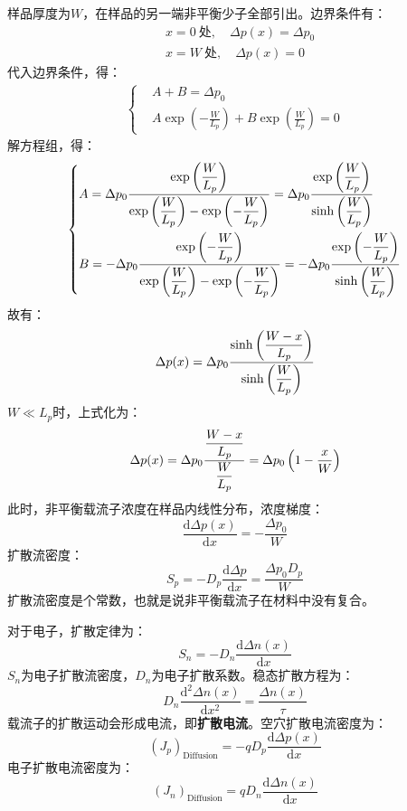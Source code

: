 样品厚度为$W$，在样品的另一端非平衡少子全部引出。边界条件有：
\begin{align}
    &x=0\ \text{处},\quad \Delta p(x)=\Delta p_0\\
    &x=W\ \text{处},\quad \Delta p(x)=0
\end{align}
代入边界条件，得：
\begin{align}
\left\{
\begin{aligned}
    &A+B=\Delta p_0\\
    &A\exp{\left(-\frac{W}{L_p}\right)}+B\exp{\left(\frac{W}{L_p}\right)}=0
\end{aligned}
\right.
\end{align}
解方程组，得：
\begin{align}
    \left\{
    \begin{aligned}
        &A=\Delta p_0\frac{\displaystyle \exp{\left(\frac{W}{L_p}\right)}}{\displaystyle \exp{\left(\frac{W}{L_p}\right)}-\exp{\left(-\frac{W}{L_p}\right)}}=\Delta p_0\frac{\displaystyle \exp{\left(\frac{W}{L_p}\right)}}{\displaystyle \sinh{\left(\frac{W}{L_p}\right)}}\\
        &B=-\Delta p_0\frac{\displaystyle \exp{\left(-\frac{W}{L_p}\right)}}{\displaystyle \exp{\left(\frac{W}{L_p}\right)}-\exp{\left(-\frac{W}{L_p}\right)}}=-\Delta p_0\frac{\displaystyle \exp{\left(-\frac{W}{L_p}\right)}}{\displaystyle \sinh{\left(\frac{W}{L_p}\right)}}
    \end{aligned}
    \right.
\end{align}
故有：
\begin{equation}
    \Delta p(x)=\Delta p_0\frac{\displaystyle \sinh{\left(\frac{W-x}{L_p}\right)}}{\displaystyle\sinh{\left(\frac{W}{L_p}\right)}}
\end{equation}
$W\ll L_p$时，上式化为：
\begin{equation}
    \Delta p(x)=\Delta p_0\frac{\displaystyle \frac{W-x}{L_p}}{\displaystyle\frac{W}{L_p}}=\Delta p_0\left(1-\frac{x}{W}\right)
\end{equation}
此时，非平衡载流子浓度在样品内线性分布，浓度梯度：
\begin{equation}
    \frac{\mathrm{d}\Delta p(x)}{\mathrm{d}x}=-\frac{\Delta p_0}{W}
\end{equation}
扩散流密度：
\begin{equation}
    S_p=-D_p\frac{\mathrm{d}\Delta p}{\mathrm{d}x}=\frac{\Delta p_0 D_p}{W}
\end{equation}
扩散流密度是个常数，也就是说非平衡载流子在材料中没有复合。

对于电子，扩散定律为：
\begin{equation}
    S_n=-D_n\frac{\mathrm{d}\Delta n(x)}{\mathrm{d}x}
\end{equation}
$S_n$为电子扩散流密度，$D_n$为电子扩散系数。稳态扩散方程为：
\begin{equation}
    D_n\frac{\mathrm{d}^2\Delta n(x)}{\mathrm{d}x^2}=\frac{\Delta n(x)}{\tau}
\end{equation}
载流子的扩散运动会形成电流，即\textbf{扩散电流}。空穴扩散电流密度为：
\begin{equation}
    (J_p)_\text{Diffusion}=-qD_p\frac{\mathrm{d}\Delta p(x)}{\mathrm{d}x}
\end{equation}
电子扩散电流密度为：
\begin{equation}
    (J_n)_\text{Diffusion}=qD_n\frac{\mathrm{d}\Delta n(x)}{\mathrm{d}x}
\end{equation}

